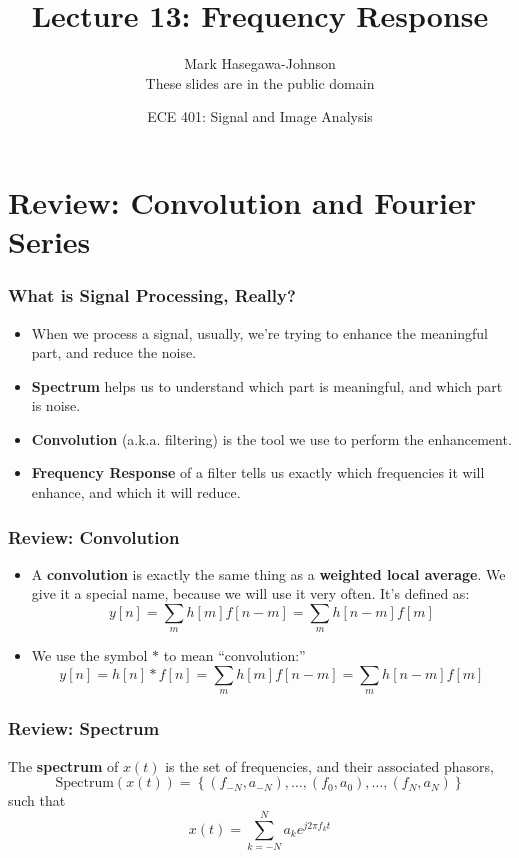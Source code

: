 \documentclass{beamer}
\title{Lecture 13: Frequency Response}
\author{Mark Hasegawa-Johnson\\These slides are in the public domain}
\date{ECE 401: Signal and Image Analysis}
\begin{document}
\begin{frame}
  \maketitle
\end{frame}

\begin{frame}
  \tableofcontents
\end{frame}

\section[Review]{Review: Convolution and Fourier Series}
\setcounter{subsection}{1}

\begin{frame}
  \frametitle{What is Signal Processing, Really?}

  \begin{itemize}
  \item When we process a signal, usually, we're trying to
    enhance the meaningful part, and reduce the noise.
  \item {\bf Spectrum} helps us  to understand which part is
    meaningful, and which part is noise.
  \item {\bf Convolution} (a.k.a. filtering) is the tool we use to
    perform the enhancement.
  \item {\bf Frequency Response} of a filter tells us exactly which
    frequencies it will enhance, and which it will reduce.
  \end{itemize}
\end{frame}

\begin{frame}
  \frametitle{Review: Convolution}
  \begin{itemize}
  \item A {\bf convolution} is exactly the same thing as a {\bf weighted local average}.
    We give it a special name, because we will use it very often.  It's defined as:
    \[
    y[n] = \sum_m h[m] f[n-m] = \sum_m h[n-m] f[m]
    \]
  \item 
    We use the symbol $\ast$ to mean ``convolution:''
    \[
    y[n]=h[n]\ast f[n] = \sum_m h[m] f[n-m] = \sum_m h[n-m] f[m]
    \]
  \end{itemize}
\end{frame}

\begin{frame}
  \frametitle{Review: Spectrum}

  The {\bf spectrum} of $x(t)$ is the set of frequencies, and their
  associated phasors,
  \[
  \mbox{Spectrum}\left( x(t) \right) =
  \left\{ (f_{-N},a_{-N}), \ldots, (f_0,a_0), \ldots, (f_N,a_N) \right\}
  \]
  such that
  \[
  x(t) = \sum_{k=-N}^N a_ke^{j2\pi f_kt}
  \]
\end{frame}
\end{document}
